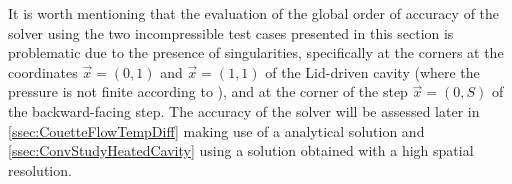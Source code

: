 It is worth mentioning that the evaluation of the global order of accuracy of the solver using the two incompressible test cases presented in this section is problematic due to the presence of singularities, specifically at the corners at the coordinates $ \vec{x} = (0,1)$ and $\vec{x} =(1,1)$ of the Lid-driven cavity (where the pressure is not finite according to \textcite{botellaBenchmarkSpectralResults1998}), and at the corner of the step $\vec{x} = (0,S)$ of the backward-facing step. The accuracy of the solver will be assessed later in  \cref{ssec:CouetteFlowTempDiff} making use of a analytical solution and \cref{ssec:ConvStudyHeatedCavity} using a solution obtained with a high spatial resolution.
